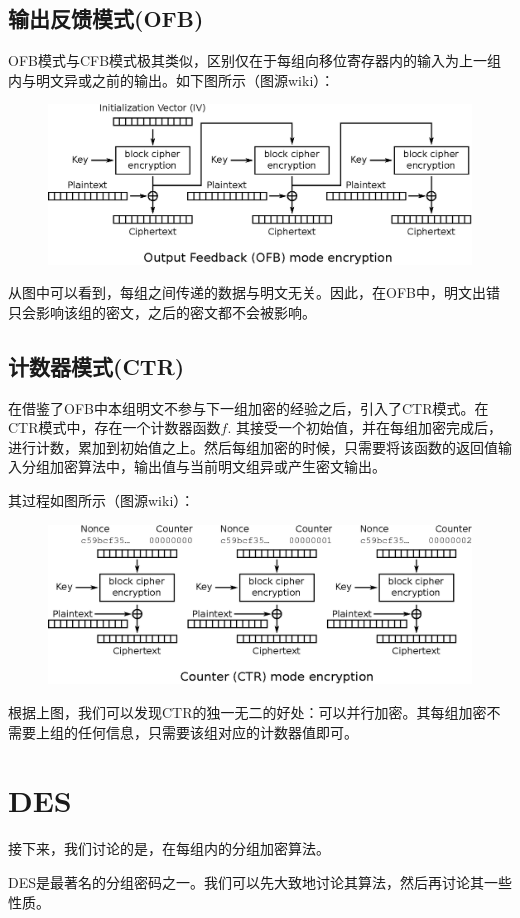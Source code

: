 \subsection{输出反馈模式(OFB)}
OFB模式与CFB模式极其类似，区别仅在于每组向移位寄存器内的输入为上一组内与明文异或之前的输出。如下图所示（图源wiki）：
\begin{figure}[H]
\centering
\includegraphics[scale=1]{chapters/chapter_3/OFB.eps}
\end{figure}

从图中可以看到，每组之间传递的数据与明文无关。因此，在OFB中，明文出错只会影响该组的密文，之后的密文都不会被影响。
\subsection{计数器模式(CTR)}
在借鉴了OFB中本组明文不参与下一组加密的经验之后，引入了CTR模式。在CTR模式中，存在一个计数器函数$f$. 其接受一个初始值，并在每组加密完成后，进行计数，累加到初始值之上。然后每组加密的时候，只需要将该函数的返回值输入分组加密算法中，输出值与当前明文组异或产生密文输出。\par
其过程如图所示（图源wiki）：
\begin{figure}[H]
\centering
\includegraphics[scale=1]{chapters/chapter_3/CTR.eps}
\end{figure}

根据上图，我们可以发现CTR的独一无二的好处：可以并行加密。其每组加密不需要上组的任何信息，只需要该组对应的计数器值即可。
\section{DES}
接下来，我们讨论的是，在每组内的分组加密算法。\par
DES是最著名的分组密码之一。我们可以先大致地讨论其算法，然后再讨论其一些性质。
